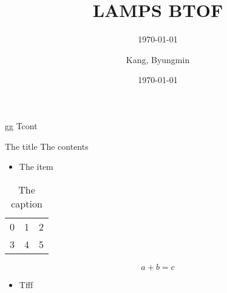\documentclass[
	xcolor=dvipsnames,
	10pt, 
	]{beamer}
\title[]{LAMPS BTOF}
\author[Author]{Kang, Byungmin}
\institute{Korea University}
\date{\today}
\subtitle{\today}
\begin{document}
\begin{frame}[t,plain] %
       \titlepage
\end{frame}
\begin{frame}{gg}
	Tcont
	\begin{block}{The title}
		The contents
		\begin{itemize}
			\item{The item}
		\end{itemize}
	\end{block}
\begin{table}
	\begin{tabular}{c|c|c}
		0&1&2\\
		3&4&5
	\end{tabular}
$$a+b=c$$
\caption{The caption}
\end{table}
	\begin{itemize}
		\item Tfff
	\end{itemize}
\end{frame}
\end{document}

